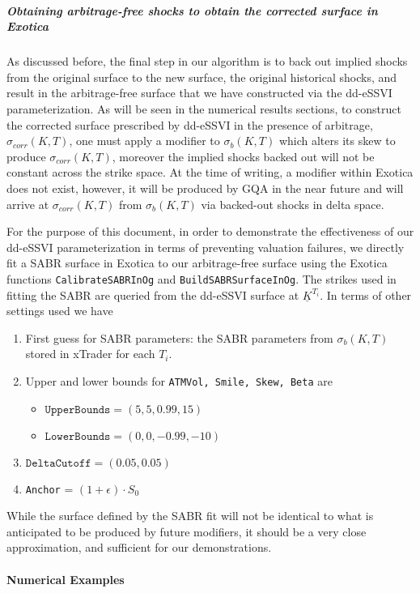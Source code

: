 \documentclass[11pt,letterpaper]{article}
\begin{document}
\subparagraph{Obtaining arbitrage-free shocks to obtain the corrected surface in Exotica} 

As discussed before, the final step in our algorithm is to back out implied shocks from the original surface to the new surface, the original historical shocks, and result in the arbitrage-free surface that we have constructed via the dd-eSSVI parameterization. As will be seen in the numerical results sections, to construct the corrected surface prescribed by dd-eSSVI in the presence of arbitrage, $\sigma_{corr}(K,T)$, one must apply a modifier to $\sigma_{b}(K,T)$ which alters its skew to produce $\sigma_{corr}(K,T)$, moreover the implied shocks backed out will not be constant across the strike space. At the time of writing, a modifier within Exotica does not exist, however, it will be produced by GQA in the near future and will arrive at $\sigma_{corr}(K,T) $ from $\sigma_b(K,T)$ via backed-out shocks in delta space. 

For the purpose of this document, in order to demonstrate the effectiveness of our dd-eSSVI parameterization in terms of preventing valuation failures, we directly fit a SABR surface in Exotica to our arbitrage-free surface using the Exotica functions \texttt{CalibrateSABRInOg} and \texttt{BuildSABRSurfaceInOg}. The strikes used in fitting the SABR are queried from the dd-eSSVI surface at $\underline{K}^{T_i}$. In terms of other settings used we have
\begin{enumerate}
\item First guess for SABR parameters: the SABR parameters from $\sigma_b(K,T)$ stored in xTrader for each $T_i$. 
\item Upper and lower bounds for \texttt{ATMVol, Smile, Skew, Beta} are 
\begin{itemize}
\item $\texttt{UpperBounds} = (5,5,0.99,15)$
\item $\texttt{LowerBounds} = (0,0,-0.99,-10)$
\end{itemize}
\item $\texttt{DeltaCutoff} = (0.05,0.05)$
\item \texttt{Anchor} = $(1+\epsilon)\cdot S_0$
\end{enumerate}
While the surface defined by the SABR fit will not be identical to what is anticipated to be produced by future modifiers, it should be a very close approximation, and sufficient for our demonstrations.

\paragraph{Numerical Examples }
\label{parag:NumEx}
\end{document}
